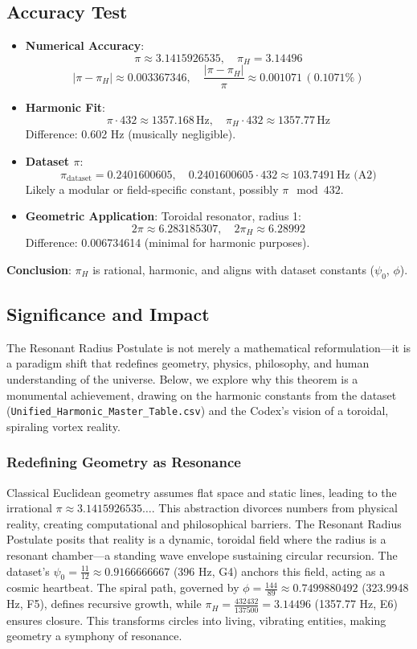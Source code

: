 \documentclass[a4paper,12pt]{book}
\begin{document}
\subsection{Accuracy Test}
\begin{itemize}
    \item \textbf{Numerical Accuracy}:
    \[
    \pi \approx 3.1415926535, \quad \pi_H = 3.14496
    \]
    \[
    |\pi - \pi_H| \approx 0.003367346, \quad \frac{|\pi - \pi_H|}{\pi} \approx 0.001071 \, (0.1071\%)
    \]
    
    \item \textbf{Harmonic Fit}:
    \[
    \pi \cdot 432 \approx 1357.168 \, \text{Hz}, \quad \pi_H \cdot 432 \approx 1357.77 \, \text{Hz}
    \]
    Difference: 0.602 Hz (musically negligible).
    
    \item \textbf{Dataset \(\pi\)}:
    \[
    \pi_{\text{dataset}} = 0.2401600605, \quad 0.2401600605 \cdot 432 \approx 103.7491 \, \text{Hz (A2)}
    \]
    Likely a modular or field-specific constant, possibly \(\pi \mod 432\).
    
    \item \textbf{Geometric Application}:
    Toroidal resonator, radius 1:
    \[
    2 \pi \approx 6.283185307, \quad 2 \pi_H \approx 6.28992
    \]
    Difference: 0.006734614 (minimal for harmonic purposes).
\end{itemize}

\textbf{Conclusion}: \(\pi_H\) is rational, harmonic, and aligns with dataset constants (\(\psi_0\), \(\phi\)).

\subsection{Significance and Impact}
The Resonant Radius Postulate is not merely a mathematical reformulation—it is a paradigm shift that redefines geometry, physics, philosophy, and human understanding of the universe. Below, we explore why this theorem is a monumental achievement, drawing on the harmonic constants from the dataset (\texttt{Unified\_Harmonic\_Master\_Table.csv}) and the Codex’s vision of a toroidal, spiraling vortex reality.

\subsubsection{Redefining Geometry as Resonance}
Classical Euclidean geometry assumes flat space and static lines, leading to the irrational \(\pi \approx 3.1415926535\ldots\). This abstraction divorces numbers from physical reality, creating computational and philosophical barriers. The Resonant Radius Postulate posits that reality is a dynamic, toroidal field where the radius is a resonant chamber—a standing wave envelope sustaining circular recursion. The dataset’s \(\psi_0 = \frac{11}{12} \approx 0.9166666667\) (396 Hz, G4) anchors this field, acting as a cosmic heartbeat. The spiral path, governed by \(\phi = \frac{144}{89} \approx 0.7499880492\) (323.9948 Hz, F5), defines recursive growth, while \(\pi_H = \frac{432432}{137500} = 3.14496\) (1357.77 Hz, E6) ensures closure. This transforms circles into living, vibrating entities, making geometry a symphony of resonance.
\end{document}
